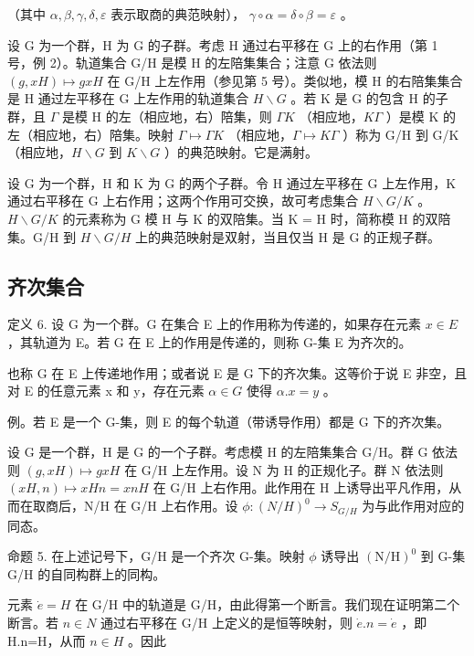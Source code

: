 （其中 \(\alpha, \beta, \gamma, \delta, \varepsilon\) 表示取商的典范映射）， \(\gamma \circ \alpha = \delta \circ \beta = \varepsilon\) 。

设 G 为一个群，H 为 G 的子群。考虑 H 通过右平移在 G 上的右作用（第 1 号，例 2）。轨道集合 G/H 是模 H 的左陪集集合；注意 G 依法则 \((g, xH) \mapsto gxH\) 在 G/H 上左作用（参见第 5 号）。类似地，模 H 的右陪集集合是 H 通过左平移在 G 上左作用的轨道集合 \(H\backslash G\) 。若 K 是 G 的包含 H 的子群，且 \(\Gamma\) 是模 H 的左（相应地，右）陪集，则 \(\Gamma K\) （相应地，\(K\Gamma\) ）是模 K 的左（相应地，右）陪集。映射 \(\Gamma \mapsto \Gamma K\) （相应地，\(\Gamma \mapsto K\Gamma\) ）称为 G/H 到 G/K（相应地，\(H\backslash G\) 到 \(K\backslash G\) ）的典范映射。它是满射。

设 G 为一个群，H 和 K 为 G 的两个子群。令 H 通过左平移在 G 上左作用，K 通过右平移在 G 上右作用；这两个作用可交换，故可考虑集合 \(H\backslash G/K\) 。\(H\backslash G/K\) 的元素称为 G 模 H 与 K 的双陪集。当 K = H 时，简称模 H 的双陪集。G/H 到 \(H\backslash G/H\) 上的典范映射是双射，当且仅当 H 是 G 的正规子群。

\subsection{齐次集合}

定义 6. 设 G 为一个群。G 在集合 E 上的作用称为传递的，如果存在元素 \(x \in E\) ，其轨道为 E。若 G 在 E 上的作用是传递的，则称 G-集 E 为齐次的。

也称 G 在 E 上传递地作用；或者说 E 是 G 下的齐次集。这等价于说 E 非空，且对 E 的任意元素 x 和 y，存在元素 \(\alpha \in G\) 使得 \(\alpha.x = y\) 。

例。若 E 是一个 G-集，则 E 的每个轨道（带诱导作用）都是 G 下的齐次集。

设 G 是一个群，H 是 G 的一个子群。考虑模 H 的左陪集集合 G/H。群 G 依法则 \((g, xH) \mapsto gxH\) 在 G/H 上左作用。设 N 为 H 的正规化子。群 N 依法则 \((xH, n) \mapsto xHn = xnH\) 在 G/H 上右作用。此作用在 H 上诱导出平凡作用，从而在取商后，N/H 在 G/H 上右作用。设 \(\phi: (N/H)^{0} \to S_{G/H}\) 为与此作用对应的同态。

命题 5. 在上述记号下，G/H 是一个齐次 G-集。映射 \(\phi\) 诱导出 \((\mathrm{N} / \mathrm{H})^0\) 到 G-集 G/H 的自同构群上的同构。

元素 \(\dot{e}=H\) 在 G/H 中的轨道是 G/H，由此得第一个断言。我们现在证明第二个断言。若 \(n\in N\) 通过右平移在 G/H 上定义的是恒等映射，则 \(\dot{e}.n=\dot{e}\) ，即 H.n=H，从而 \(n\in H\) 。因此

